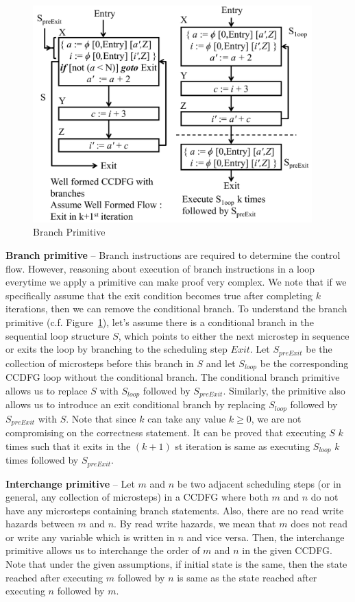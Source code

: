 \begin{figure}[H]
\begin{center}
\includegraphics[height=3.3in]{fig-proposal/conditional-branch-primitive}
\end{center}
\caption{Branch Primitive}
\label{fig:branch-primitive}
\end{figure}

{\textbf {Branch primitive}} -- Branch instructions are required to determine the control flow. However, reasoning about execution of branch instructions in a loop everytime we apply a primitive can make proof very complex.
We note that if we specifically assume that the exit condition becomes true after completing $k$ iterations, then we can remove the conditional branch.
To understand the branch primitive (c.f. Figure~\ref{fig:branch-primitive}), 
let's assume there is a conditional branch in the sequential loop structure $S$, which points to either
the next microstep in sequence or exits the loop by branching to the scheduling step
$Exit$. Let $S_{preExit}$ be the collection of microsteps before this branch in $S$ and
let $S_{loop}$ be the corresponding CCDFG loop without the conditional branch.
The conditional branch primitive allows us to replace $S$ with $S_{loop}$ followed by
$S_{preExit}$. Similarly,
the primitive also allows us to introduce an exit conditional branch by replacing
$S_{loop}$ followed by $S_{preExit}$ with $S$.
Note that since $k$ can take any value $k \ge 0$, we are not compromising on the correctness statement.  
It can be proved that executing $S$ $k$ times such that it exits in the $(k+1)$ st
iteration is same as executing $S_{loop}$ $k$ times followed by $S_{preExit}$.

{\textbf {Interchange primitive}} -- Let $m$ and $n$ be two adjacent scheduling steps (or in general, any collection of microsteps) in a CCDFG where both $m$ and $n$ do not have any microsteps containing branch statements. Also, there are no read write hazards between $m$ and $n$. By read write hazards, we mean that $m$ does not read or write any variable which is written in $n$ and vice versa. Then, the interchange primitive allows us to interchange the order of $m$ and $n$ in the given CCDFG. Note that under the given assumptions, if initial state is the same, then the state reached after executing $m$ followed by $n$ is same as the state reached after executing $n$ followed by $m$.

